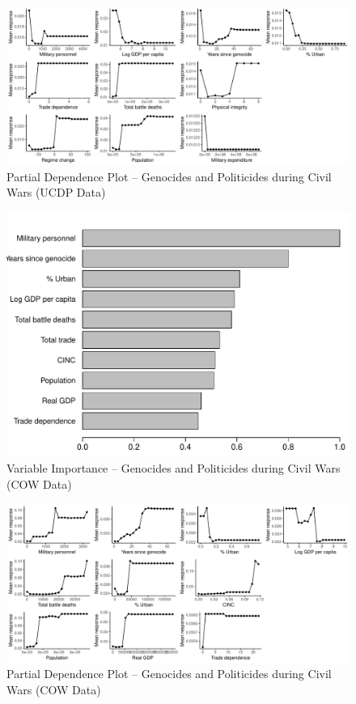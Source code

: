 \documentclass[a4paper,12pt]{article}
\begin{document}
\newpage 

\begin{figure}[H]
    \centering
    \includegraphics[width=.98\textheight,angle=90]{images/rf-uamk-ucdp-pd.pdf}
    \caption{Partial Dependence Plot -- Genocides and Politicides during Civil Wars (UCDP Data)}
    \label{fig:rf-mk-ucdp-pd}
\end{figure}

\begin{figure}[H]
    \centering
    \includegraphics{images/rf-uamk-cow.pdf}
    \caption{Variable Importance -- Genocides and Politicides during Civil Wars (COW Data)}
    \label{fig:rf-mk-ucdp}
\end{figure}

\newpage 

\begin{figure}[H]
    \centering
    \includegraphics[width=.98\textheight,angle=90]{images/rf-uamk-cow-pd.pdf}
    \caption{Partial Dependence Plot -- Genocides and Politicides during Civil Wars (COW Data)}
    \label{fig:rf-mk-ucdp-pd}
\end{figure}
\end{document}
